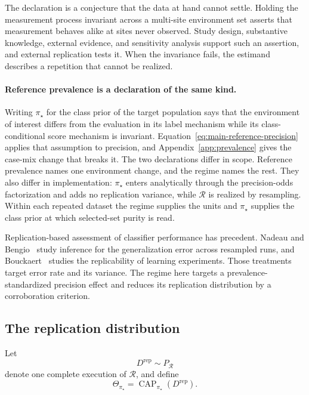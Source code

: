 \documentclass[11pt]{article}
\newcommand{\CAP}{\operatorname{CAP}}
\newcommand{\Regime}{\mathcal{R}}
\newcommand{\Tpi}{\CAP_{\pi_\star}}
\theoremstyle{remark}
\begin{document}
The declaration is a conjecture that the data at hand cannot settle. Holding the measurement process invariant across a multi-site environment set asserts that measurement behaves alike at sites never observed. Study design, substantive knowledge, external evidence, and sensitivity analysis support such an assertion, and external replication tests it. When the invariance fails, the estimand describes a repetition that cannot be realized.

\paragraph{Reference prevalence is a declaration of the same kind.}
Writing $\pi_\star$ for the class prior of the target population says that the environment of interest differs from the evaluation in its label mechanism while its class-conditional score mechanism is invariant. Equation~\eqref{eq:main-reference-precision} applies that assumption to precision, and Appendix~\ref{app:prevalence} gives the case-mix change that breaks it. The two declarations differ in scope. Reference prevalence names one environment change, and the regime names the rest. They also differ in implementation: $\pi_\star$ enters analytically through the precision-odds factorization and adds no replication variance, while $\Regime$ is realized by resampling. Within each repeated dataset the regime supplies the units and $\pi_\star$ supplies the class prior at which selected-set purity is read.

Replication-based assessment of classifier performance has precedent. Nadeau and Bengio~\cite{nadeau2003inference} study inference for the generalization error across resampled runs, and Bouckaert~\cite{bouckaert2004estimating} studies the replicability of learning experiments. Those treatments target error rate and its variance. The regime here targets a prevalence-standardized precision effect and reduces its replication distribution by a corroboration criterion.

\subsection{The replication distribution}

Let
\[
D^{\mathrm{rep}}\sim P_{\Regime}
\]
denote one complete execution of $\Regime$, and define
\begin{equation}
\Theta_{\pi_\star}
=
\Tpi(D^{\mathrm{rep}}).
\label{eq:Theta}
\end{equation}
\end{document}
